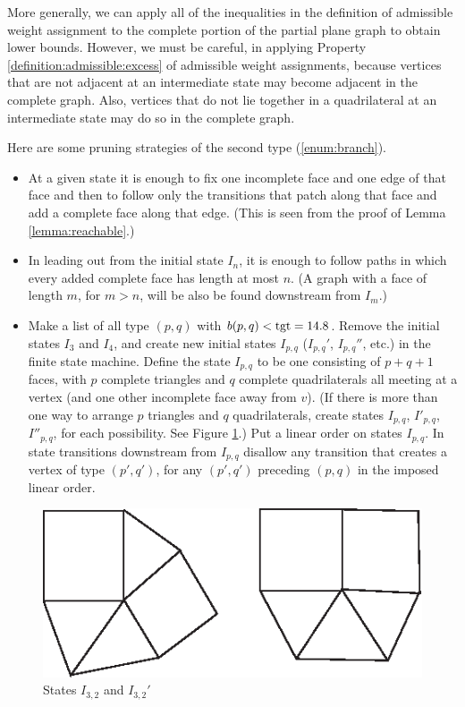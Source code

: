 More generally, we can apply all of the inequalities in the
definition of admissible weight assignment to the complete portion
of the partial plane graph to obtain lower bounds.  However, we
must be careful, in applying Property
\ref{definition:admissible:excess} of admissible weight
assignments, because vertices that are not adjacent at an
intermediate state may become adjacent in the complete graph.
Also, vertices that do not lie together in a quadrilateral at an
intermediate state may do so in the complete graph.


Here are some pruning strategies of the second type
(\ref{enum:branch}).
\begin{itemize}
    \item At a given state it is enough to fix one incomplete face and
        one edge of that face and then to follow only the transitions that
        patch along that face and add a complete face along that
        edge. (This is seen from the proof of Lemma
        \ref{lemma:reachable}.)
    \item In leading out from the initial state $I_n$, it is enough
        to follow paths in which every added complete face has
        length at most $n$. (A graph with a face of length $m$,
        for $m>n$, will be also be found downstream from $I_m$.)
    \item Make a list of all type $(p,q)$ with $b(p,q)<{\operatorname{tgt}}=14.8$.
    Remove the initial states $I_3$ and $I_4$, and create new initial states
    $I_{p,q}$  ($I_{p,q}'$, $I_{p,q}''$, etc.)
    in the finite state machine.  Define the state $I_{p,q}$ to be
    one consisting of $p+q+1$ faces, with $p$ complete triangles
    and $q$ complete quadrilaterals all meeting at a vertex
    (and one other incomplete face away from $v$).
    (If there is more than one way to arrange $p$ triangles and
    $q$ quadrilaterals, create states $I_{p,q}$, $I'_{p,q}$,
    $I''_{p,q}$, for each possibility.  See Figure \ref{fig:states}.)
    Put a linear order on states $I_{p,q}$.  In state transitions
    downstream from $I_{p,q}$ disallow any transition that creates
    a vertex of type $(p',q')$, for any $(p',q')$ preceding $(p,q)$
    in the imposed linear order.
\end{itemize}
\begin{figure}[htb]
  \centering
  \includegraphics{PS/Ipq.eps}
  \caption{States $I_{3,2}$ and $I_{3,2}'$}
  \label{fig:states}
\end{figure}

